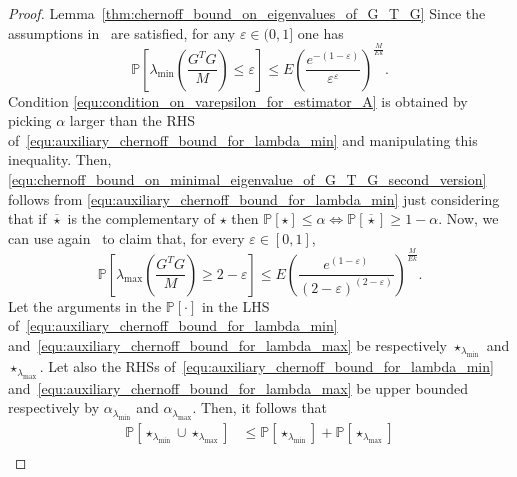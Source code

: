 \documentclass[10pt,twocolumn,twoside]{IEEEtran}					%
\theoremstyle	{plain}
\newcommand{\Probability}			[0]	{\mathbb{P}}
\newcommand{\ProbabilityOf}			[1]	{\Probability \left[ #1 \right]}
\begin{document}
\begin{proof}{Lemma~\ref{thm:chernoff_bound_on_eigenvalues_of_G_T_G}} 
Since the assumptions in~\cite[Thm.~1.1]{tropp__2012__user_friendly_tail_bounds_for_sums_of_random_matrices} are satisfied, for any $\varepsilon \in (0, 1]$ one has
	\begin{equation}
		\ProbabilityOf
		{
			\lambda_{\min} \left( \frac{G^{T} G}{M} \right)
			\leq
			\varepsilon
		}
		\leq
		E
		\left(
			\frac{e^{-(1-\varepsilon)}}{\varepsilon^{\varepsilon}}
		\right)^{\displaystyle \frac{M}{E k}} .
	\label{equ:auxiliary_chernoff_bound_for_lambda_min}
	\end{equation}
	Condition \eqref{equ:condition_on_varepsilon_for_estimator_A} is obtained by picking $\alpha$ larger than the \ac{RHS} of~\eqref{equ:auxiliary_chernoff_bound_for_lambda_min} and manipulating this inequality. Then, \eqref{equ:chernoff_bound_on_minimal_eigenvalue_of_G_T_G_second_version} follows from \eqref{equ:auxiliary_chernoff_bound_for_lambda_min} just considering that if $\overline{\star}$ is the complementary of $\star$ then $\ProbabilityOf{\star} \leq \alpha \Leftrightarrow \ProbabilityOf{\overline{\star}} \geq 1 - \alpha$. Now, we can use again~\cite[Thm.~1.1]{tropp__2012__user_friendly_tail_bounds_for_sums_of_random_matrices} to claim that, for every $\varepsilon \in [0, 1]$, 
	\begin{equation}
		\ProbabilityOf
		{
			\lambda_{\max} \left( \frac{G^{T} G}{M} \right)
			\geq
			2 - \varepsilon
		}
		\leq
		E
		\left(
			\frac{e^{(1-\varepsilon)}}{(2-\varepsilon)^{(2-\varepsilon)}}
		\right)^{\displaystyle \frac{M}{E k}} .
	\label{equ:auxiliary_chernoff_bound_for_lambda_max}
	\end{equation}
	Let the arguments in the $\ProbabilityOf{\cdot}$ in the \ac{LHS} of~\eqref{equ:auxiliary_chernoff_bound_for_lambda_min} and~\eqref{equ:auxiliary_chernoff_bound_for_lambda_max} be respectively $\star_{\lambda_{\min}}$ and $\star_{\lambda_{\max}}$. Let also the \acp{RHS} of~\eqref{equ:auxiliary_chernoff_bound_for_lambda_min} and~\eqref{equ:auxiliary_chernoff_bound_for_lambda_max} be upper bounded respectively by $\alpha_{\lambda_{\min}}$ and $\alpha_{\lambda_{\max}}$. Then, it follows that
	\begin{equation}
		\begin{array}{ll}
		\ProbabilityOf{\star_{\lambda_{\min}} \cup \star_{\lambda_{\max}}}
		& \leq
		\ProbabilityOf{\star_{\lambda_{\min}}} + \ProbabilityOf{\star_{\lambda_{\max}}}
		\\

\end{array}
\end{equation}
\end{proof}
\end{document}
